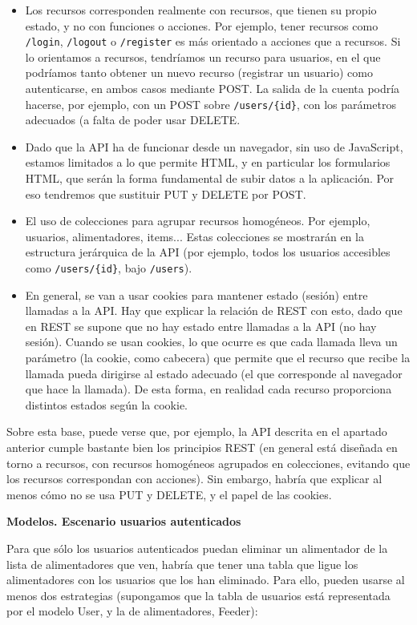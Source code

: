 \begin{itemize}
\item Los recursos corresponden realmente con recursos, que tienen su propio estado, y no con funciones o acciones. Por ejemplo, tener recursos como \verb|/login|, \verb|/logout| o \verb|/register| es más orientado a acciones que a recursos. Si lo orientamos a recursos, tendríamos un recurso para usuarios, en el que podríamos tanto obtener un nuevo recurso (registrar un usuario) como autenticarse, en ambos casos mediante POST. La salida de la cuenta podría hacerse, por ejemplo, con un POST sobre \verb|/users/{id}|, con los parámetros adecuados (a falta de poder usar DELETE.
\item Dado que la API ha de funcionar desde un navegador, sin uso de JavaScript, estamos limitados a lo que permite HTML, y en particular los formularios HTML, que serán la forma fundamental de subir datos a la aplicación. Por eso tendremos que sustituir PUT y DELETE por POST.
\item El uso de colecciones para agrupar recursos homogéneos. Por ejemplo, usuarios, alimentadores, items... Estas colecciones se mostrarán en la estructura jerárquica de la API (por ejemplo, todos los usuarios accesibles como \verb|/users/{id}|, bajo \verb|/users|).
\item En general, se van a usar cookies para mantener estado (sesión) entre llamadas a la API. Hay que explicar la relación de REST con esto, dado que en REST se supone que no hay estado entre llamadas a la API (no hay sesión). Cuando se usan cookies, lo que ocurre es que cada llamada lleva un parámetro (la cookie, como cabecera) que permite que el recurso que recibe la llamada pueda dirigirse al estado adecuado (el que corresponde al navegador que hace la llamada). De esta forma, en realidad cada recurso proporciona distintos estados según la cookie.
\end{itemize}

Sobre esta base, puede verse que, por ejemplo, la API descrita en el apartado anterior cumple bastante bien los principios REST (en general está diseñada en torno a recursos, con recursos homogéneos agrupados en colecciones, evitando que los recursos correspondan con acciones). Sin embargo, habría que explicar al menos cómo no se usa PUT y DELETE, y el papel de las cookies.

\textbf{Modelos. Escenario usuarios autenticados}

Para que sólo los usuarios autenticados puedan eliminar un alimentador de la lista de alimentadores que ven, habría que tener una tabla que ligue los alimentadores con los usuarios que los han eliminado. Para ello, pueden usarse al menos dos estrategias (supongamos que la tabla de usuarios está representada por el modelo User, y la de alimentadores, Feeder):

